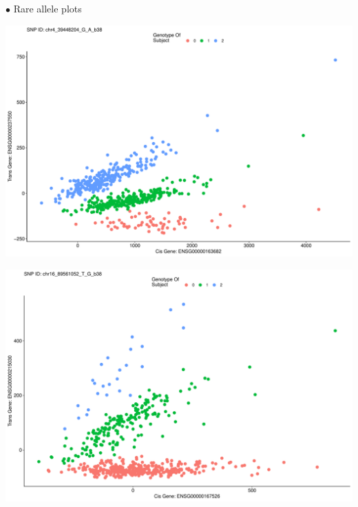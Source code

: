 \documentclass[
]{article}
\begin{document}
\(\bullet\) Rare allele plots

\includegraphics{GMACwriteup_files/figure-latex/unnamed-chunk-13-1.pdf}

\includegraphics{GMACwriteup_files/figure-latex/unnamed-chunk-14-1.pdf}
\end{document}
